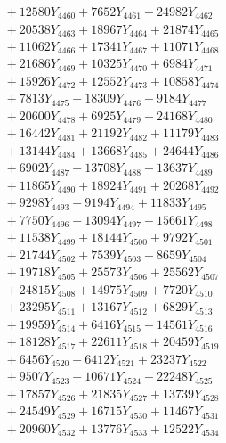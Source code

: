 \documentclass[a4paper,10pt]{article}
\begin{document}
{\begin{align}
&\;  + 12580 Y_{4460} + 7652 Y_{4461} + 24982 Y_{4462} \\[0.3ex]
&\;  + 20538 Y_{4463} + 18967 Y_{4464} + 21874 Y_{4465} \\[0.3ex]
&\;  + 11062 Y_{4466} + 17341 Y_{4467} + 11071 Y_{4468} \\[0.5ex]\allowbreak
&\;  + 21686 Y_{4469} + 10325 Y_{4470} + 6984 Y_{4471} \\[0.3ex]
&\;  + 15926 Y_{4472} + 12552 Y_{4473} + 10858 Y_{4474} \\[0.3ex]
&\;  + 7813 Y_{4475} + 18309 Y_{4476} + 9184 Y_{4477} \\[0.3ex]
&\;  + 20600 Y_{4478} + 6925 Y_{4479} + 24168 Y_{4480} \\[0.3ex]
&\;  + 16442 Y_{4481} + 21192 Y_{4482} + 11179 Y_{4483} \\[0.3ex]
&\;  + 13144 Y_{4484} + 13668 Y_{4485} + 24644 Y_{4486} \\[0.3ex]
&\;  + 6902 Y_{4487} + 13708 Y_{4488} + 13637 Y_{4489} \\[0.3ex]
&\;  + 11865 Y_{4490} + 18924 Y_{4491} + 20268 Y_{4492} \\[0.3ex]
&\;  + 9298 Y_{4493} + 9194 Y_{4494} + 11833 Y_{4495} \\[0.3ex]
&\;  + 7750 Y_{4496} + 13094 Y_{4497} + 15661 Y_{4498} \\[0.5ex]\allowbreak
&\;  + 11538 Y_{4499} + 18144 Y_{4500} + 9792 Y_{4501} \\[0.3ex]
&\;  + 21744 Y_{4502} + 7539 Y_{4503} + 8659 Y_{4504} \\[0.3ex]
&\;  + 19718 Y_{4505} + 25573 Y_{4506} + 25562 Y_{4507} \\[0.3ex]
&\;  + 24815 Y_{4508} + 14975 Y_{4509} + 7720 Y_{4510} \\[0.3ex]
&\;  + 23295 Y_{4511} + 13167 Y_{4512} + 6829 Y_{4513} \\[0.3ex]
&\;  + 19959 Y_{4514} + 6416 Y_{4515} + 14561 Y_{4516} \\[0.3ex]
&\;  + 18128 Y_{4517} + 22611 Y_{4518} + 20459 Y_{4519} \\[0.3ex]
&\;  + 6456 Y_{4520} + 6412 Y_{4521} + 23237 Y_{4522} \\[0.3ex]
&\;  + 9507 Y_{4523} + 10671 Y_{4524} + 22248 Y_{4525} \\[0.3ex]
&\;  + 17857 Y_{4526} + 21835 Y_{4527} + 13739 Y_{4528} \\[0.5ex]\allowbreak
&\;  + 24549 Y_{4529} + 16715 Y_{4530} + 11467 Y_{4531} \\[0.3ex]
&\;  + 20960 Y_{4532} + 13776 Y_{4533} + 12522 Y_{4534} \\[0.3ex]

\end{align}}
\end{document}
